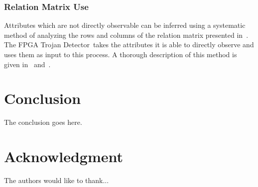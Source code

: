 \documentclass[conference]{IEEEtran}
\newcommand{\Name}{\acrshort{FPGA} Trojan Detector}
\newcommand{\NameNoPeriod}{\Name~}
\begin{document}
\subsubsection{Relation Matrix Use} \label{sec:matrixUse}
Attributes which are not directly observable can be inferred using a systematic method of analyzing the rows and columns of the relation matrix presented in~\cite{samerAttribute}.
The \NameNoPeriod takes the attributes it is able to directly observe and uses them as input to this process.
A thorough description of this method is given in~\cite{samerDissertation} and~\cite{meCategorization}.

\section{Conclusion}
The conclusion goes here.






\section*{Acknowledgment}


The authors would like to thank...

\printbibliography
\end{document}
